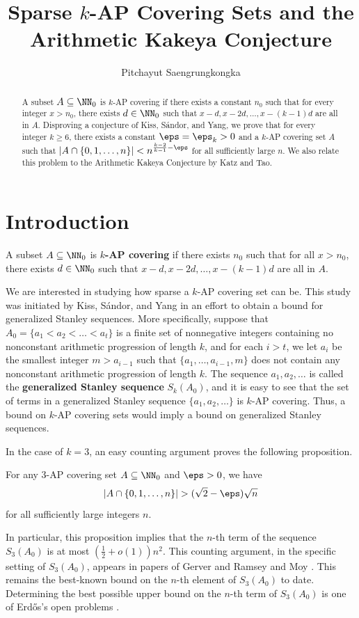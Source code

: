 \documentclass[11pt,reqno]{amsart}
\title{Sparse $k$-AP Covering Sets and the Arithmetic Kakeya Conjecture}
\author{Pitchayut Saengrungkongka}
\renewcommand{\textbf}[1]{{\bfseries\boldmath #1}}
\newcommand{\vocab}[1]{\textbf{\textcolor{BrickRed}{\boldmath #1}}}
\begin{document}
\begin{abstract}
A subset $A\subseteq \NN_0$ is $k$-AP covering
if there exists a constant $n_0$ such that 
for every integer $x>n_0$, there exists $d\in\NN_0$ such that 
 $x-d, x-2d,\dots,x-(k-1)d$ are all in $A$.
Disproving a conjecture of Kiss, S\'andor, and Yang,
we prove that for every integer $k\geq 6$, there exists a constant 
$\eps=\eps_k>0$ and a $k$-AP covering set 
$A$ such that 
$|A\cap \{0,1,\dots,n\}| <  n^{\frac{k-2}{k-1}-\eps}$
for all sufficiently large $n$.
We also relate this problem to the Arithmetic 
Kakeya Conjecture by Katz and Tao.
\end{abstract}
\maketitle

\section{Introduction}

\begin{definition}
A subset $A\subseteq \NN_0$ is \vocab{$k$-AP covering}
if there exists $n_0$ such that for all $x>n_0$,
there exists $d\in\NN_0$ such that 
 $x-d, x-2d,\dots,x-(k-1)d$ are all in $A$.
\end{definition}
We are interested in studying how sparse a $k$-AP covering set can be. 
This study was initiated by 
Kiss, S\'andor, and Yang \cite{generalized} 
in an effort to obtain a bound for generalized Stanley sequences.
More specifically, suppose that $A_0=\{a_1 < a_2 < \dots < a_t\}$
is a finite set of nonnegative integers containing no nonconstant arithmetic 
progression of length $k$, and for each $i>t$,
we let $a_i$ be the smallest integer $m>a_{i-1}$ such that 
$\{a_1,\dots,a_{i-1},m\}$ does not contain any nonconstant 
arithmetic progression of length $k$.
The sequence $a_1,a_2,\dots$ is called the \vocab{generalized 
Stanley sequence} $S_k(A_0)$, and it is easy to see that 
the set of terms in a generalized Stanley sequence
$\{a_1,a_2,\dots\}$ is $k$-AP covering.
Thus, a bound on $k$-AP covering sets would imply 
a bound on generalized Stanley sequences.

In the case of $k=3$, an easy counting argument proves 
the following proposition. 
\begin{proposition}
For any $3$-AP covering set $A\subseteq\NN_0$
and $\eps>0$, we have
$$|A\cap \{0,1,\dots,n\}| > (\sqrt 2-\eps)\sqrt n$$
for all sufficiently large integers $n$.
\end{proposition}
In particular, this proposition implies that the 
$n$-th term of the sequence $S_3(A_0)$ is at most 
$\left(\tfrac 12+o(1)\right)n^2$.
This counting argument, in the specific setting of 
$S_3(A_0)$, appears in papers of Gerver and Ramsey 
\cite{quadratic_growth} and Moy \cite{quadratic_growth_2}.
This remains the best-known bound on the $n$-th element 
of $S_3(A_0)$ to date.
Determining the best possible upper bound 
on the $n$-th term of $S_3(A_0)$ is 
one of Erd\H os's open problems \cite{erdos_271}.
\end{document}

